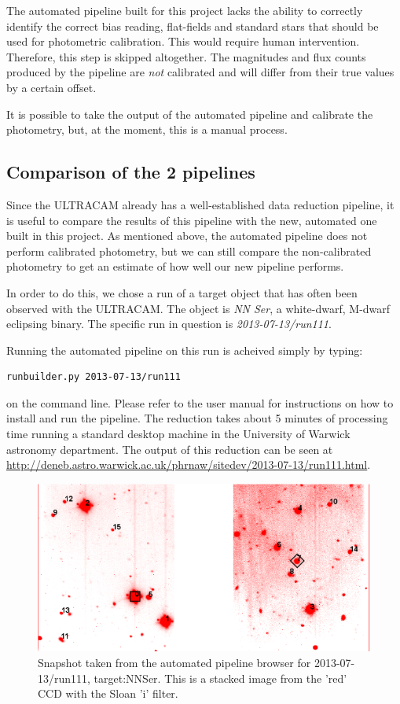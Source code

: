 The automated pipeline built for this project lacks the ability to correctly identify the correct bias reading, flat-fields and standard stars that should be used for photometric calibration. This would require human intervention. Therefore, this step is skipped altogether. The magnitudes and flux counts produced by the pipeline are \emph{not} calibrated and will differ from their true values by a certain offset.

It is possible to take the output of the automated pipeline and calibrate the photometry, but, at the moment, this is a manual process. 

\subsection{Comparison of the 2 pipelines}
Since the ULTRACAM already has a well-established data reduction pipeline, it is useful to compare the results of this pipeline with the new, automated one built in this project. As mentioned above, the automated pipeline does not perform calibrated photometry, but we can still compare the non-calibrated photometry to get an estimate of how well our new pipeline performs.

In order to do this, we chose a run of a target object that has often been observed with the ULTRACAM. The object is \emph{NN Ser}, a white-dwarf, M-dwarf eclipsing binary. The specific run in question is \emph{2013-07-13/run111}.

Running the automated pipeline on this run is acheived simply by typing: \begin{verbatim}runbuilder.py 2013-07-13/run111 \end{verbatim} on the command line. Please refer to the user manual \cite{chap:usermanual} for instructions on how to install and run the pipeline.  The reduction takes about 5 minutes of processing time running a standard desktop machine in the University of Warwick astronomy department. The output of this reduction can be seen at \url{http://deneb.astro.warwick.ac.uk/phrnaw/sitedev/2013-07-13/run111.html}.

\begin{figure}[!h]
\centering
\includegraphics[width=120mm]{images/2013-07-13-run111-r-withlabels.png}
\caption{Snapshot taken from the automated pipeline browser for 2013-07-13/run111, target:NNSer. This is a stacked image from the 'red' CCD with the Sloan 'i' filter. }
\label{fig:nnser}
\end{figure}




